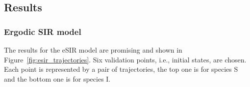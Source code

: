\documentclass{article}
\begin{document}
\subsection{Results}

\subsubsection{Ergodic SIR model}
The results for the eSIR model are promising and shown in Figure~\ref{fig:esir_trajectories}. Six validation points, i.e., initial states, are chosen. Each point is represented by a pair of trajectories, the top one is for species S and the bottom one is for species I.
\begin{figure}[hb]
    \centering

\end{figure}
\end{document}

